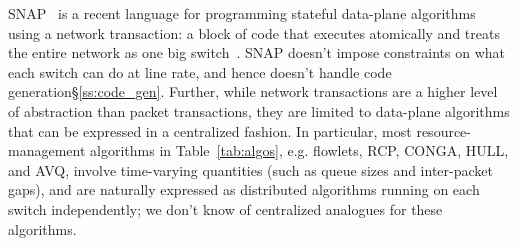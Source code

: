 SNAP~\cite{snap} is a recent language for programming stateful data-plane
algorithms using a network transaction: a block of code that executes
atomically and treats the entire network as one big switch~\cite{onebigswitch}.
SNAP doesn't impose constraints on what each switch can do at line rate, and
hence doesn't handle code generation\S\ref{ss:code_gen}. Further, while network
transactions are a higher level of abstraction than packet transactions, they
are limited to data-plane algorithms that can be expressed in a centralized
fashion. In particular, most resource-management algorithms in
Table~\ref{tab:algos}, e.g. flowlets, RCP, CONGA, HULL, and AVQ, involve
time-varying quantities (such as queue sizes and inter-packet gaps), and are
naturally expressed as distributed algorithms running on each switch
independently; we don't know of centralized analogues for these algorithms.

%
%

